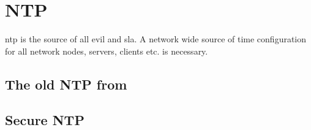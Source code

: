 \chapter{NTP}

\gls{ntp} is the source of all evil and \gls{sla}. A network wide source of time configuration for all network nodes, servers, clients etc. is necessary.

\section{The old NTP from }

\section{Secure NTP}


